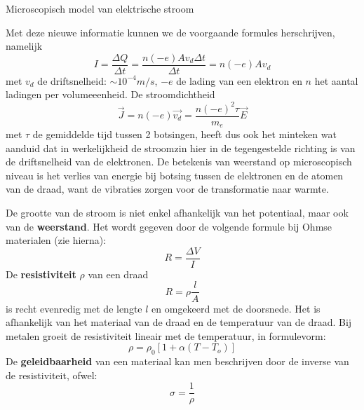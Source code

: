\begin{app}{Microscopisch model van elektrische stroom}
\begin{center}
    \end{center}
    Met deze nieuwe informatie kunnen we de voorgaande formules herschrijven, namelijk
    \begin{equation*}
        I = \dfrac{\Delta Q}{\Delta t} = \dfrac{n(-e)Av_d\Delta t}{\Delta t} = n(-e)Av_d
    \end{equation*}
    met $v_d$ de driftsnelheid: $\sim 10^{-4} m/s$, $-e$ de lading van een elektron en $n$ het aantal ladingen per volumeeenheid. De stroomdichtheid
    \begin{equation*}
        \Vec{J} = n(-e)\Vec{v_d} = \dfrac{n(-e)^2\tau}{m_e}\Vec{E}
    \end{equation*}
    met $\tau$ de gemiddelde tijd tussen 2 botsingen, heeft dus ook het minteken wat aanduid dat in werkelijkheid de stroomzin hier in de tegengestelde richting is van de driftsnelheid van de elektronen. De betekenis van weerstand op microscopisch niveau is het verlies van energie bij botsing tussen de elektronen en de atomen van de draad, want de vibraties zorgen voor de transformatie naar warmte.
\end{app}

\begin{theo}{}
    De grootte van de stroom is niet enkel afhankelijk van het potentiaal, maar ook van de \textbf{weerstand}. Het wordt gegeven door de volgende formule bij Ohmse materialen (zie hierna):
    \begin{equation*}
        R = \dfrac{\Delta V}{I} 
    \end{equation*}
    De \textbf{resistiviteit} $\rho$ van een draad 
    \begin{equation*}
        R = \rho \dfrac{l}{A}
    \end{equation*}
    is recht evenredig met de lengte $l$ en omgekeerd met de doorsnede. Het is afhankelijk van het materiaal van de draad en de temperatuur van de draad. Bij metalen groeit de resistiviteit lineair met de temperatuur, in formulevorm:
    \begin{equation*}
        \rho = \rho_0[1+\alpha(T-T_o)]
    \end{equation*}
    De \textbf{geleidbaarheid} van een materiaal kan men beschrijven door de inverse van de resistiviteit, ofwel:
    \begin{equation*}
        \sigma = \dfrac{1}{\rho}
    \end{equation*}
    \vspace{-0.5cm}
\end{theo}

